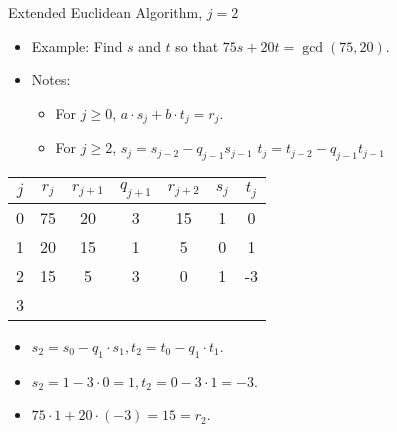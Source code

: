 \documentclass[handout]{beamer}
\begin{document}
\begin{frame}{Extended Euclidean Algorithm, $j=2$}

\begin{itemize}
  \item Example: Find $s$ and $t$ so that $75s+20t = \gcd(75, 20)$.
  \item Notes:
  \begin{itemize}
    \item For $j\geq0$, $a \cdot s_j + b \cdot t_j = r_j$.
    \item For $j\geq 2$, $s_j=s_{j-2} - q_{j-1}s_{j-1}$ \quad $t_j=t_{j-2} - q_{j-1}t_{j-1}$
  \end{itemize}
\end{itemize}

\vspace{1em}

\begin{tabular}{|c|c|c|c|c|c|c|}\hline
$j$   &  $r_{j}$    & $r_{j+1}$ & $q_{j+1}$ & $r_{j+2}$ & $s_j$ & $t_j$ \\ \hline\hline
0     &  75         &  20       &    3      &   15      &  1    &   0   \\ \hline
1     &  20         &  15       &    1      &    5      &  0    &   1   \\ \hline
2     &  15         &   5       &    3      &    0      &  1    &  -3   \\ \hline
3     &             &           &           &           &       &       \\ \hline
\end{tabular}

\vspace{1em}

\begin{itemize}
  \item $s_2 = s_0 - q_1 \cdot s_1, t_2 = t_0 - q_1 \cdot t_1$.
  \item $s_2 =1 - 3 \cdot 0 = 1, t_2 = 0 - 3 \cdot 1 = -3$.
  \item $75\cdot 1 + 20 \cdot (-3) = 15 = r_2$.
\end{itemize}

\end{frame}
\end{document}
